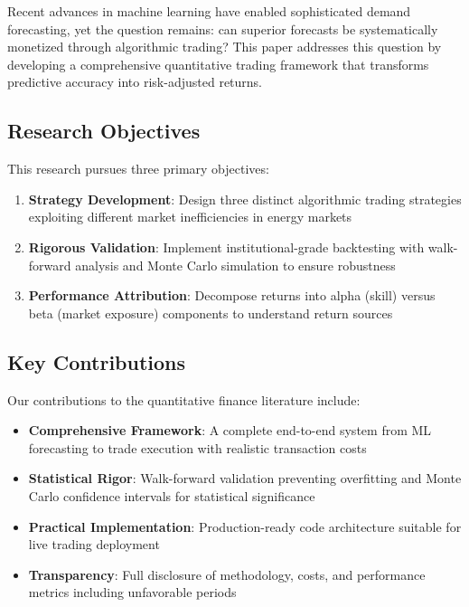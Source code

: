 \documentclass[12pt,a4paper]{article}
\begin{document}
Recent advances in machine learning have enabled sophisticated demand forecasting, yet the question remains: can superior forecasts be systematically monetized through algorithmic trading? This paper addresses this question by developing a comprehensive quantitative trading framework that transforms predictive accuracy into risk-adjusted returns.

\subsection{Research Objectives}

This research pursues three primary objectives:

\begin{enumerate}
    \item \textbf{Strategy Development}: Design three distinct algorithmic trading strategies exploiting different market inefficiencies in energy markets
    \item \textbf{Rigorous Validation}: Implement institutional-grade backtesting with walk-forward analysis and Monte Carlo simulation to ensure robustness
    \item \textbf{Performance Attribution}: Decompose returns into alpha (skill) versus beta (market exposure) components to understand return sources
\end{enumerate}

\subsection{Key Contributions}

Our contributions to the quantitative finance literature include:

\begin{itemize}
    \item \textbf{Comprehensive Framework}: A complete end-to-end system from ML forecasting to trade execution with realistic transaction costs
    \item \textbf{Statistical Rigor}: Walk-forward validation preventing overfitting and Monte Carlo confidence intervals for statistical significance
    \item \textbf{Practical Implementation}: Production-ready code architecture suitable for live trading deployment
    \item \textbf{Transparency}: Full disclosure of methodology, costs, and performance metrics including unfavorable periods
\end{itemize}
\end{document}
